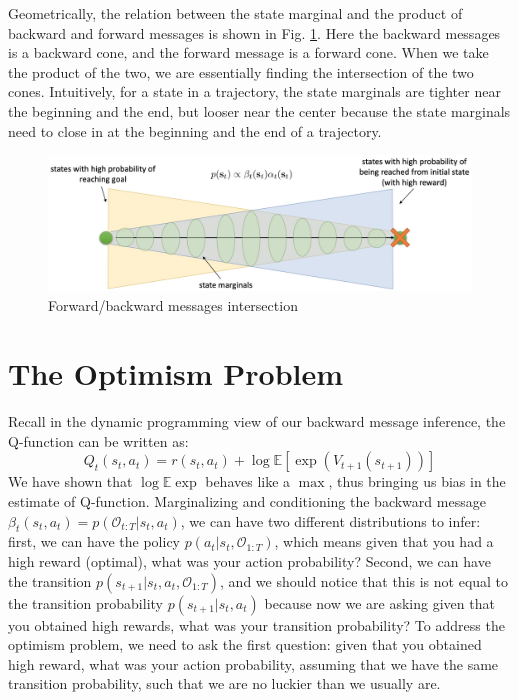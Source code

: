 Geometrically, the relation between the state marginal and the product of backward and forward messages is shown in Fig. \ref{fig:marginal}. Here the backward messages is a backward cone, and the forward message is a forward cone. When we take the product of the two, we are essentially finding the intersection of the two cones. Intuitively, for a state in a trajectory, the state marginals are tighter near the beginning and the end, but looser near the center because the state marginals need to close in at the beginning and the end of a trajectory.
\begin{figure}
    \centering
    \includegraphics[scale=0.4]{figures/marginal.png}
    \caption{Forward/backward messages intersection}
    \label{fig:marginal}
\end{figure}

\section{The Optimism Problem}
Recall in the dynamic programming view of our backward message inference, the Q-function can be written as:
\[
Q_t(s_t,a_t) = r(s_t,a_t) + \log \mathbb{E}[\exp (V_{t+1}(s_{t+1}))]
\]
We have shown that $\log\mathbb{E}\exp$ behaves like a $\max$, thus bringing us bias in the estimate of Q-function. Marginalizing and conditioning the backward message $\beta_t(s_t,a_t) = p(\mathcal{O}_{t:T}|s_t,a_t)$, we can have two different distributions to infer: first, we can have the policy $p(a_t|s_t,\mathcal{O}_{1:T})$, which means given that you had a high reward (optimal), what was your action probability? Second, we can have the transition $p(s_{t+1}|s_t,a_t,\mathcal{O}_{1:T})$, and we should notice that this is not equal to the transition probability $p(s_{t+1}|s_t,a_t)$ because now we are asking given that you obtained high rewards, what was your transition probability? To address the optimism problem, we need to ask the first question: given that you obtained high reward, what was your action probability, assuming that we have the same transition probability, such that we are no luckier than we usually are. 

